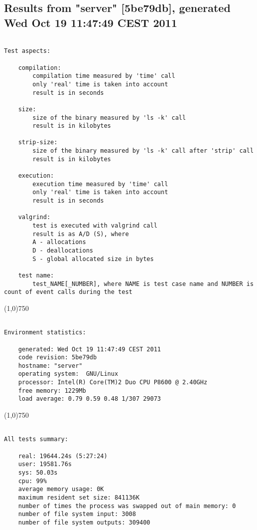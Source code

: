 \clearpage
\subsection{Results from "server" [5be79db], generated Wed Oct 19 11:47:49 CEST 2011}
\begin{verbatim}

Test aspects:

    compilation:
        compilation time measured by 'time' call
        only 'real' time is taken into account
        result is in seconds

    size:
        size of the binary measured by 'ls -k' call
        result is in kilobytes

    strip-size:
        size of the binary measured by 'ls -k' call after 'strip' call
        result is in kilobytes

    execution:
        execution time measured by 'time' call
        only 'real' time is taken into account
        result is in seconds

    valgrind:
        test is executed with valgrind call
        result is as A/D (S), where
        A - allocations
        D - deallocations
        S - global allocated size in bytes

    test name:
        test_NAME[_NUMBER], where NAME is test case name and NUMBER is count of event calls during the test
\end{verbatim}
\begin{center}
\line(1,0){750}
\end{center}
\begin{verbatim}

Environment statistics:

    generated: Wed Oct 19 11:47:49 CEST 2011
    code revision: 5be79db
    hostname: "server"
    operating system:  GNU/Linux
    processor: Intel(R) Core(TM)2 Duo CPU P8600 @ 2.40GHz
    free memory: 1229Mb
    load average: 0.79 0.59 0.48 1/307 29073
\end{verbatim}
\begin{center}
\line(1,0){750}
\end{center}
\begin{verbatim}

All tests summary:

    real: 19644.24s (5:27:24)
    user: 19581.76s
    sys: 50.03s
    cpu: 99%
    average memory usage: 0K
    maximum resident set size: 841136K
    number of times the process was swapped out of main memory: 0
    number of file system input: 3008
    number of file system outputs: 309400
\end{verbatim}
